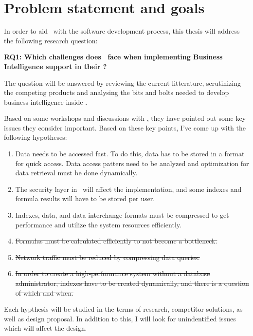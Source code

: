 \section{Problem statement and goals}
\label{sec:problem-statement-and-goals}
In order to aid \genus~with the software development process, this thesis will address the following research question:

\textbf{RQ1: Which challenges does \genus~face when implementing Business Intelligence support in their \genusSoftware?}

The question will be answered by reviewing the current litterature, scrutinizing the competing products and analysing the bits and bolts needed to develop business intelligence inside \genusSoftware.

Based on some workshops and discussions with \genus , they have pointed out some key issues they consider important. Based on these key points, I've come up with the following hypotheses:
\begin{enumerate}\bfseries
  \item Data needs to be accessed fast. To do this, data has to be stored in a format for quick access. Data access patters need to be analyzed and optimization for data retrieval must be done dynamically.
  \item The security layer in \genusSoftware~will affect the implementation, and some indexes and formula results will have to be stored per user.
  \item Indexes, data, and data interchange formats must be compressed to get performance and utilize the system resources efficiently.
  \item \sout{Formulas must be calculated efficiently to not become a bottleneck.}
  \item \sout{Network traffic must be reduced by compressing data queries.}
  \item \sout{In order to create a high-performance system without a database administrator, indexes have to be created dynamically, and there is a question of which and when.}
\end{enumerate}

Each hypthesis will be studied in the terms of research, competitor solutions, as well as design proposal. In addition to this, I will look for unindentified issues which will affect the design.


